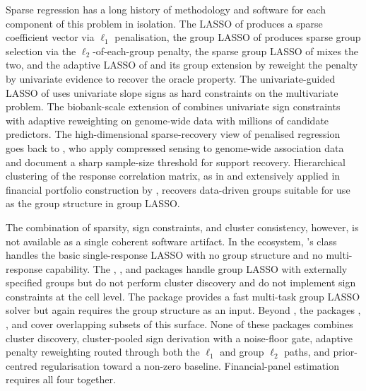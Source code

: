 \documentclass[article]{jss}
\begin{document}
Sparse regression has a long history of methodology and software for
each component of this problem in isolation. The LASSO of
\cite{Tibshirani:1996} produces a sparse coefficient vector via $\ell_1$
penalisation, the group LASSO of \cite{Yuan+Lin:2006} produces sparse
group selection via the $\ell_2$-of-each-group penalty, the sparse group
LASSO of \cite{Simon+Friedman+Hastie+Tibshirani:2013} mixes the two,
and the adaptive LASSO of \cite{Zou:2006} and its group extension by
\cite{Wang+Leng:2008} reweight the penalty by univariate evidence to
recover the oracle property. The univariate-guided LASSO of
\cite{Chatterjee+Hastie+Tibshirani:2025} uses univariate slope signs
as hard constraints on the multivariate problem. The biobank-scale
extension of \cite{Richland+Kiiskinen+Wang+Lu+Narasimhan+Hastie+Rivas+Tibshirani:2025}
combines univariate sign constraints with adaptive reweighting on
genome-wide data with millions of candidate predictors. The
high-dimensional sparse-recovery view of penalised regression goes
back to \cite{Vattikuti+Lee+Chang+Hsu+Chow:2014}, who apply
compressed sensing to genome-wide association data and document a
sharp sample-size threshold for support recovery. Hierarchical clustering of the response
correlation matrix, as in \cite{Bondell+Reich:2008} and extensively
applied in financial portfolio construction by
\cite{LopezdePrado:2016}, recovers data-driven groups suitable for use
as the group structure in group LASSO.

The combination of sparsity, sign constraints, and cluster consistency,
however, is not available as a single coherent software artifact. In
the  ecosystem, 's 
class \citep{Pedregosa+etal:2011} handles the basic single-response
LASSO with no group structure and no multi-response capability. The
 \citep{Moe:2020}, 
\citep{Mendez-Civieta+Aguilera-Morillo+Lillo:2021}, and 
\citep{Massias+Gramfort+Salmon:2018} packages handle group
LASSO with externally specified groups but do not perform cluster
discovery and do not implement sign constraints at the cell level. The
 package \citep{Yang+Hastie:2024} provides a fast
multi-task group LASSO solver but again requires the group structure as
an input. Beyond , the  packages
 \citep{Yang+Zou:2015}, 
\citep{Liang+Cohen+SolonHeinsfeld+Pestilli+McDonald:2024}, and
 \citep{Huling+Chien:2022} cover overlapping subsets of this
surface. None of these packages combines cluster discovery,
cluster-pooled sign derivation with a noise-floor gate, adaptive
penalty reweighting routed through both the $\ell_1$ and group $\ell_2$ paths, and
prior-centred regularisation toward a non-zero baseline. Financial-panel
estimation requires all four together.
\end{document}
